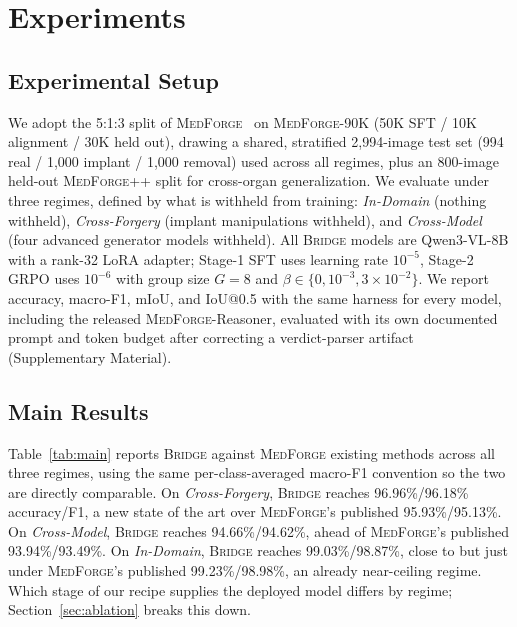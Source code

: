 \documentclass[10pt,twocolumn,letterpaper]{article}
\newcommand{\bridge}{\textsc{Bridge}}
\newcommand{\medforge}{\textsc{MedForge}}
\newcommand{\medforgepp}{\textsc{MedForge++}}
\begin{document}
\section{Experiments}
\label{sec:exp}

\subsection{Experimental Setup}
\label{sec:setup}
We adopt the 5:1:3 split of \medforge{}~\cite{medforge2026} on \medforge{}-90K (50K SFT / 10K alignment / 30K held out), drawing a shared, stratified 2{,}994-image test set (994 real / 1{,}000 implant / 1{,}000 removal) used across all regimes, plus an 800-image held-out \medforgepp{} split for cross-organ generalization. We evaluate under three regimes, defined by what is withheld from training: \emph{In-Domain} (nothing withheld), \emph{Cross-Forgery} (implant manipulations withheld), and \emph{Cross-Model} (four advanced generator models withheld). All \bridge{} models are Qwen3-VL-8B with a rank-32 LoRA adapter; Stage-1 SFT uses learning rate $10^{-5}$, Stage-2 GRPO uses $10^{-6}$ with group size $G{=}8$ and $\beta \in \{0, 10^{-3}, 3{\times}10^{-2}\}$. We report accuracy, macro-F1, mIoU, and IoU@0.5 with the same harness for every model, including the released \medforge{}-Reasoner, evaluated with its own documented prompt and token budget after correcting a verdict-parser artifact (Supplementary Material).

\subsection{Main Results}
\label{sec:main}
Table~\ref{tab:main} reports \bridge{} against \medforge{} existing methods across all three regimes, using the same per-class-averaged macro-F1 convention so the two are directly comparable. On \emph{Cross-Forgery}, \bridge{} reaches 96.96\%/96.18\% accuracy/F1, a new state of the art over \medforge{}'s published 95.93\%/95.13\%. On \emph{Cross-Model}, \bridge{} reaches 94.66\%/94.62\%, ahead of \medforge{}'s published 93.94\%/93.49\%. On \emph{In-Domain}, \bridge{} reaches 99.03\%/98.87\%, close to but just under \medforge{}'s published 99.23\%/98.98\%, an already near-ceiling regime. Which stage of our recipe supplies the deployed model differs by regime; Section~\ref{sec:ablation} breaks this down.
\end{document}
